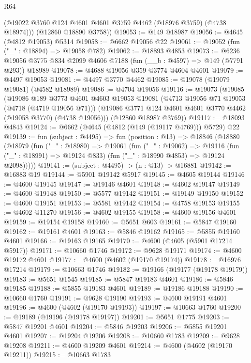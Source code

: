 \begin{lexlean}{R64}
\begin{coremodule}
        (@19022 @3760 @124 @4601 @4601 @3759 @4462 (@18976 @3759) (@4738 @18974)))
      (@12860 @18890 @3758))
@19053 := @149 @18987
@19056 := @4645 (@4812 @19053) @5314
@19058 := @6662 @19056 @22
@19061 := @19052 (fun ("_" : @18894) => @19058 @782)
@19062 := @18893 @4853
@19073 := @6236 @19056 @3775 @834 @2099 @4606 @7188 (fun (__b : @4597) => @149 (@7791 @293)) @18989
@19078 := @4688 @19056 @359 @3774 @4604 @4601
@19079 := @4497 @19053
@19081 := @4497 @3770 @4462
@19085 := @19078 (@19079 @19081) (@4582 @18989)
@19086 := @4704 @19056
@19116 := @19073
    (@19085
      (@19086
        @189
        @3773
        @4601
        @4603
        @19053
        @19081
        (@4713 @19056 @71 @19053 (@4718 (@4719 @19056 @71)))
        (@19086 @3771 @124 @4601 @4601 @3770 @4462 (@19058 @3770) (@4738 @19056)))
      (@12860 @18987 @3769))
@19117 := @18093 @4843
@19124 := @6662 (@4645 (@4812 (@149 (@19117 @4769))) @5729) @22
@19139 := fun (subject : @4495) =>
  fun (position : @13) =>
  @18846
    (@18880
      (@18979
        (fun ("_" : @18980) =>
        @19061
          (fun ("_" : @19062) =>
          @19116 (fun ("_" : @18991) => @19124 @833) (fun ("_" : @18990 @4853) => @19124 @2098)))))
@19141 := (subject : @4495) -> (n : @13) -> @16881
@19142 := @16883 @19
@19144 := @5901 @19142 @5917
@19145 := @4605 @19144
@19146 := @4600 @19145
@19147 := @19146 @4601
@19148 := @4602 @19147
@19149 := @4600 @19148
@19150 := @5577 @19142
@19151 := @19149 @19150
@19152 := @4600 @19151
@19153 := @5581 @19142
@19154 := @4758 @19153
@19155 := @4602 @11270
@19156 := @4602 @19155
@19158 := @4600 @19156 @4601
@19159 := @19154 @19158
@19160 := @5651 @603
@19161 := @5847 @19160
@19162 := @19161 @4601
@19163 := @5846 @19162
@19165 := @5855 @19160 @4601
@19166 := @19163 @19165
@19170 := @4600 (@4605 (@5901 @17214 @5917))
@19171 := @10660 @1746
@19172 := @9628 @19171
@19174 := @4600 @19172 @4601
@19177 := @4600 (@4602 (@19170 @19174))
@19178 := @16976 @17214
@19179 := @10663 @1746
@19182 := @19166 (@19177 (@19178 @19179))
@19183 := @5651 @1545
@19185 := @5847 @19183 @4601
@19186 := @5846 @19185
@19188 := @5855 @19183 @4601
@19189 := @19186 @19188
@19190 := @10660 @1760
@19191 := @9628 @19190
@19193 := @4600 @19191 @4601
@19196 := @4600 (@4602 (@19170 @19193))
@19197 := @10663 @1760
@19200 := @19189 (@19196 (@19178 @19197))
@19201 := @5651 @1775
@19203 := @5847 @19201 @4601
@19204 := @5846 @19203
@19206 := @5855 @19201 @4601
@19207 := @19204 @19206
@19208 := @10660 @1783
@19209 := @9628 @19208
@19211 := @4600 @19209 @4601
@19214 := @4600 (@4602 (@19170 @19211))
@19215 := @10663 @1783

\end{coremodule}
\end{lexlean}
